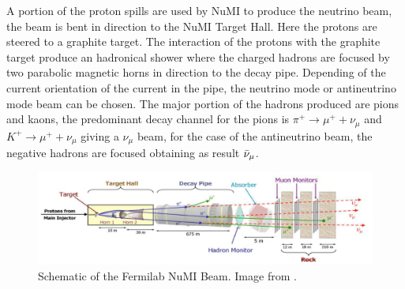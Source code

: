 A portion of the proton spills are used by NuMI to produce the neutrino beam, the beam is bent in direction to the NuMI Target Hall. Here the protons are steered to a graphite target. The interaction of the protons with the graphite target produce an hadronical shower where the charged hadrons are focused by two parabolic magnetic horns in direction to the decay pipe. Depending of the current orientation of the current in the pipe, the neutrino mode or antineutrino mode beam can be chosen. The major portion of the hadrons produced are pions and kaons, the predominant decay channel for the pions is $\pi^+ \longrightarrow \mu^+ + \nu_\mu$ and $K^+ \longrightarrow \mu^+ + \nu_\mu$ giving a $\nu_\mu$ beam, for the case of the antineutrino beam, the negative hadrons are focused obtaining as result $\Bar{\nu}_\mu$. 


\begin{figure}[!htb]
\centering
\includegraphics[scale=0.38]{Figures/Chapter2/NuMIScketch.png}
        \caption{Schematic of the Fermilab NuMI Beam. Image from \cite{Numi}.} 
\label{fig:MnvExp:NuMI:SchematicNuMIBeam}
\end{figure}

